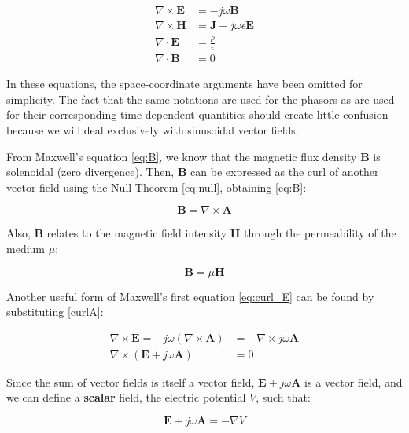 \begin{align}
    \nabla \times \mathbf{E} &= -j\omega \mathbf{B} 
    \label{eq:curl_E} \\
    \nabla \times \mathbf{H} &= \mathbf{J} + j\omega 
    \epsilon \mathbf{E} \label{eq:curl_H} \\
    \nabla \cdot \mathbf{E} &= \frac{\rho}{\epsilon} 
    \label{eq:E} \\
    \nabla \cdot \mathbf{B} &= 0 \label{eq:B}
\end{align}

In these equations, the space-coordinate arguments 
have been omitted for simplicity. The fact that 
the same notations are used for the phasors as 
are used for their corresponding time-dependent 
quantities should create little confusion because 
we will deal exclusively with sinusoidal vector 
fields.

From Maxwell's equation \ref{eq:B}, we know that 
the magnetic flux density \(\mathbf{B}\) is solenoidal 
(zero divergence). Then, \(\mathbf{B}\) can be expressed 
as the curl of another vector field using the 
Null Theorem \ref{eq:null}, obtaining \ref{eq:B}:

\begin{equation}
    \mathbf{B} = \nabla \times \mathbf{A}
    \label{curlA}
\end{equation}

Also, \(\mathbf{B}\) relates to the magnetic field 
intensity \(\mathbf{H}\) through the permeability of 
the medium \(\mu\):

\begin{equation}
    \mathbf{B} = \mu \mathbf{H}
    \label{eq:BH}
\end{equation}

Another useful form of Maxwell's first equation 
\ref{eq:curl_E} can be found by substituting 
\ref{curlA}:

\begin{align}
    \nabla \times \mathbf{E} = - j \omega 
    (\nabla \times \mathbf{A}) &= -\nabla \times 
    j \omega \mathbf{A} \nonumber \\
    \nabla \times \left(\mathbf{E} + 
    j \omega \mathbf{A}\right) &= 0 \nonumber
\end{align}

Since the sum of vector fields is itself a vector 
field, \(\mathbf{E} + j \omega \mathbf{A}\) is a 
vector field, and we can define a \textbf{scalar} 
field, the electric potential \(V\), such that:

\begin{equation}
    \mathbf{E} + j \omega \mathbf{A} = -\nabla V
    \label{eq:V}
\end{equation}

